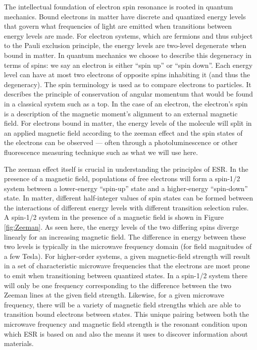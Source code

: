 \documentclass[oneside, noacknowlegments]{BYUPhys}
\begin{document}
The intellectual foundation of electron spin resonance is rooted in quantum mechanics. Bound electrons in matter have discrete and quantized energy levels that govern what frequencies of light are emitted when transitions between energy levels are made. For electron systems, which are fermions and thus subject to the Pauli exclusion principle, the energy levels are two-level degenerate when bound in matter. In quantum mechanics we choose to describe this degeneracy in terms of spins: we say an electron is either ``spin up'' or ``spin down''. Each energy level can have at most two electrons of opposite spins inhabiting it (and thus the degeneracy). The spin terminology is used as to compare electrons to particles. It describes the principle of conservation of angular momentum that would be found in a classical system such as a top. In the case of an electron, the electron's spin is a description of the magnetic moment's alignment to an external magnetic field. For electrons bound in matter, the energy levels of the molecule will split in an applied magnetic field according to the zeeman effect and the spin states of the electrons can be observed --- often through a photoluminescence or other fluorescence measuring technique such as what we will use here.

The zeeman effect itself is crucial in understanding the principles of ESR. In the presence of a magnetic field, populations of free electrons will form a spin-1/2 system between a lower-energy ``spin-up'' state and a higher-energy ``spin-down'' state. In matter, different half-integer values of spin states can be formed between the interactions of different energy levels with different transition selection rules. A spin-1/2 system in the presence of a magnetic field is shown in Figure \ref{fig:Zeeman}. As seen here, the energy levels of the two differing spins diverge linearly for an increasing magnetic field. The difference in energy between these two levels is typically in the microwave frequency domain (for field magnitudes of a few Tesla). For higher-order systems, a given magnetic-field strength will result in a set of characteristic microwave frequencies that the electrons are most prone to emit when transitioning between quantized states. In a spin-1/2 system there will only be one frequency corresponding to the difference between the two Zeeman lines at the given field strength. Likewise, for a given microwave frequency, there will be a variety of magnetic field strengths which are able to transition bound electrons between states. This unique pairing between both the microwave frequency and magnetic field strength is the resonant condition upon which ESR is based on and also the means it uses to discover information about materials.
\end{document}
